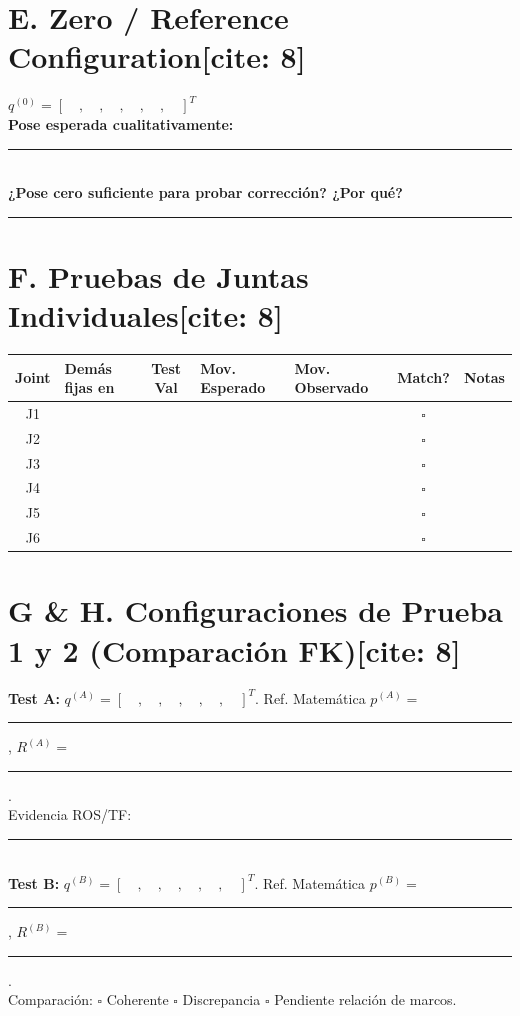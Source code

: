 \documentclass[11pt, a4paper]{article}
\begin{document}
\section*{E. Zero / Reference Configuration[cite: 8]}
$q^{(0)} = [ \quad, \quad, \quad, \quad, \quad, \quad ]^T$ \\
\textbf{Pose esperada cualitativamente:} \rule{8cm}{0.15mm} \\
\textbf{¿Pose cero suficiente para probar corrección? ¿Por qué?} \rule{6cm}{0.15mm}

\section*{F. Pruebas de Juntas Individuales[cite: 8]}
\begin{center}
    \footnotesize
    \noindent\begin{tabularx}{\textwidth}{|c|X|c|X|X|c|c|}
    \hline
    \textbf{Joint} & \textbf{Demás fijas en} & \textbf{Test Val} & \textbf{Mov. Esperado} & \textbf{Mov. Observado} & \textbf{Match?} & \textbf{Notas} \\ \hline
    J1 & & & & & $\square$ & \\ \hline
    J2 & & & & & $\square$ & \\ \hline
    J3 & & & & & $\square$ & \\ \hline
    J4 & & & & & $\square$ & \\ \hline
    J5 & & & & & $\square$ & \\ \hline
    J6 & & & & & $\square$ & \\ \hline
    \end{tabularx}
\end{center}

\section*{G \& H. Configuraciones de Prueba 1 y 2 (Comparación FK)[cite: 8]}
\textbf{Test A:} $q^{(A)} = [ \quad, \quad, \quad, \quad, \quad, \quad ]^T$. Ref. Matemática $p^{(A)} =$ \rule{2cm}{0.15mm}, $R^{(A)} =$ \rule{2cm}{0.15mm}. \\
Evidencia ROS/TF: \rule{10cm}{0.15mm} \\
\textbf{Test B:} $q^{(B)} = [ \quad, \quad, \quad, \quad, \quad, \quad ]^T$. Ref. Matemática $p^{(B)} =$ \rule{2cm}{0.15mm}, $R^{(B)} =$ \rule{2cm}{0.15mm}. \\
Comparación: $\square$ Coherente \quad $\square$ Discrepancia \quad $\square$ Pendiente relación de marcos.
\end{document}
